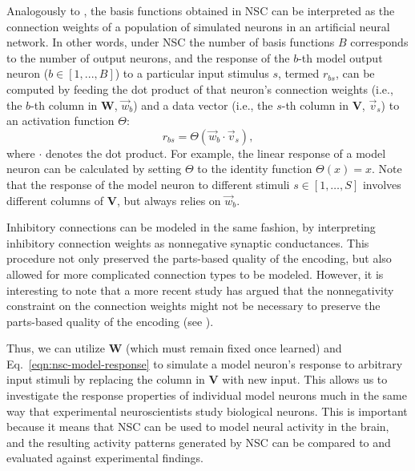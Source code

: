 Analogously to \cite{OlshausenField1996,OlshausenField1997},
the basis functions obtained in \ac{NSC} can be interpreted as
the connection weights of a population of simulated neurons
in an artificial neural network.
In other words, under \ac{NSC} the number of basis functions $B$ 
corresponds to the number of output neurons, and the
response of the $b$-th model output neuron
($b \in [1, ..., B]$)
to a particular input stimulus $s$, termed $r_{bs}$,
can be computed by feeding the dot product of
that neuron's connection weights
(i.e., the $b$-th column in $\mathbf{W}$, $\vec{w}_b$)
and a data vector
(i.e., the $s$-th column in \textbf{V}, $\vec{v}_s$)
to an activation function $\Theta$:
\begin{equation}
r_{bs} = \Theta(\vec{w}_b \cdot \vec{v}_s),
\label{eqn:nsc-model-response}
\end{equation}
where $\cdot$ denotes the dot product.
For example, the linear response of a model neuron
can be calculated by setting $\Theta$ to the identity function $\Theta(x)=x$.
Note that the response of the model neuron to different stimuli 
$s \in [1, \ldots, S]$
involves different columns of \textbf{V},
but always relies on $\vec{w}_b$.

Inhibitory connections can be modeled in the same fashion,
by interpreting inhibitory connection weights
as nonnegative synaptic conductances.
This procedure not only preserved the parts-based quality of the encoding,
but also allowed for more complicated connection types to be modeled.
However, it is interesting to note that a more recent study has argued
that the nonnegativity constraint on the
connection weights might not be necessary 
to preserve the parts-based quality of the encoding (see \cite{Liu2017}).

Thus, we can utilize \textbf{W} 
(which must remain fixed once learned)
and Eq.~\ref{eqn:nsc-model-response}
to simulate a model neuron's response to arbitrary input stimuli
by replacing the column in \textbf{V} with new input.
This allows us to investigate the response properties 
of individual model neurons
much in the same way that experimental neuroscientists 
study biological neurons.
This is important because it means that \ac{NSC} can be used to 
model neural activity in the brain, 
and the resulting activity patterns generated by \ac{NSC}
can be compared to and evaluated against experimental findings. 

